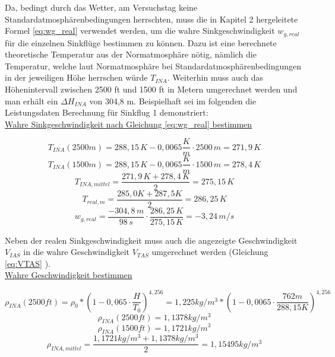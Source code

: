 \noindent Da, bedingt durch das Wetter, am Versuchstag keine Standardatmosphärenbedingungen herrschten, muss die in Kapitel 2 hergeleitete Formel \ref{eq:wg_real} verwendet werden, um die wahre Sinkgeschwindigkeit $w_{g,real}$ für die einzelnen Sinkflüge bestimmen zu können. Dazu ist eine berechnete theoretische Temperatur aus der Normatmosphäre nötig, nämlich die Temperatur, welche laut Normatmosphäre bei Standardatmosphärenbedingungen in der jeweiligen Höhe herrschen würde $T_{INA}$. Weiterhin muss auch das Höhenintervall zwischen 2500 ft und 1500 ft in Metern umgerechnet werden und man erhält ein $\Delta H_{INA}$ von 304,8 m. Beispielhaft sei im folgenden die Leistungsdaten Berechnung für Sinkflug 1 demonstriert:\\

\noindent 
\underline{Wahre Sinkgeschwindigkeit nach Gleichung \ref{eq:wg_real} bestimmen}

\begin{equation*}
T_{INA}(2500m) = 288,15\,K - 0,0065 \frac{K}{m} \cdot 2500\,m = 271,9\,K
\end{equation*}
\begin{equation*}
T_{INA}(1500m) = 288,15\,K - 0,0065 \frac{K}{m} \cdot 1500\,m = 278,4\,K
\end{equation*}
\begin{equation*}
T_{INA,mittel} = \frac{271,9\,K + 278,4\,K}{2} = 275,15\,K
\end{equation*}
\begin{equation*}
T_{real,m} = \frac{285,0 K + 287,5 K}{2} =	286,25\,K
\end{equation*}
\begin{equation*}
w_{g,real} = \frac{-304,8\,m}{98\,s} \cdot \frac{286,25\,K}{275,15\,K} = - 3,24\,m/s
\end{equation*}

\vspace{5mm}
\noindent Neben der realen Sinkgeschwindigkeit muss auch die angezeigte Geschwindigkeit $V_{IAS}$ in die wahre Geschwindigkeit $V_{TAS}$ umgerechnet werden (Gleichung \ref{eq:VTAS} ).\\


\noindent
\underline{Wahre Geschwindigkeit bestimmen}

\begin{equation*}
\rho_{INA}(2500ft) = \rho_0 * (1-0,065\cdot \frac{H}{T_0})^{4,256} = 1,225 kg/m^3 * (1-0,0065\cdot \frac{762 m}{288,15 K})^{4,256}
\end{equation*}
\begin{equation*}
\rho_{INA}(2500ft) = 1,1378 kg/m^3
\end{equation*}
\begin{equation*}
\rho_{INA}(1500ft) = 1,1721 kg/m^3
\end{equation*}
\begin{equation*}
\rho_{INA,mittel} = \frac{1,1721 kg/m^3+1,1378 kg/m^3}{2} = 1,15495 kg/m^3
\end{equation*}

